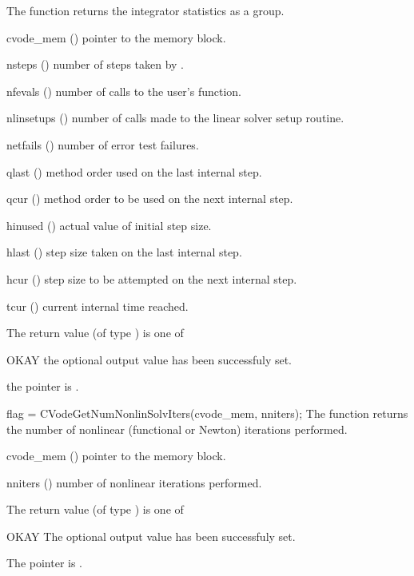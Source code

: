 {
  The function  returns the {\cvode} integrator statistics
  as a group.
}
{
  \begin{args}
  \item[cvode\_mem] ()
    pointer to the {\cvode} memory block.
  \item[nsteps] ()
    number of steps taken by {\cvode}.
  \item[nfevals] ()
    number of calls to the user's  function.
  \item[nlinsetups] ()
    number of calls made to the linear solver setup routine.
  \item[netfails] ()
    number of error test failures.
  \item[qlast] ()
    method order used on the last internal step.
  \item[qcur] ()
    method order to be used on the next internal step.
  \item[hinused] ()
    actual value of initial step size.
  \item[hlast] ()
    step size taken on the last internal step.
  \item[hcur] ()
    step size to be attempted on the next internal step.
  \item[tcur] ()
    current internal time reached.
  \end{args}
}
{
  The return value  (of type ) is one of
  \begin{args}
  \item[OKAY] 
    the optional output value has been successfuly set.
  \item[\Id{CVG\_NO\_MEM}]
    the  pointer is .
  \end{args}
}
{}
{
  flag = CVodeGetNumNonlinSolvIters(cvode\_mem, nniters);
}
{
  The function  returns the
  number of nonlinear (functional or Newton) iterations performed. 
}
{
  \begin{args}
  \item[cvode\_mem] ()
    pointer to the {\cvode} memory block.
  \item[nniters] ()
    number of nonlinear iterations performed.
  \end{args}
}
{
  The return value  (of type ) is one of
  \begin{args}
  \item[OKAY] 
    The optional output value has been successfuly set.
  \item[\Id{CVG\_NO\_MEM}]
    The  pointer is .
  \end{args}
}
